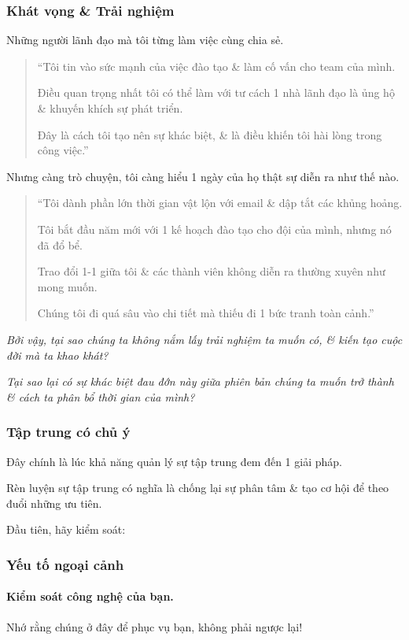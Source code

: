 \documentclass{article}
\begin{document}
\subsubsection{Khát vọng \& Trải nghiệm}
Những người lãnh đạo mà tôi từng làm việc cùng chia sẻ.
\begin{quotation}
	``Tôi tin vào sức mạnh của việc đào tạo \& làm cố vấn cho team của mình.
	
	Điều quan trọng nhất tôi có thể làm với tư cách 1 nhà lãnh đạo là ủng hộ \& khuyến khích sự phát triển.
	
	Đây là cách tôi tạo nên sự khác biệt, \& là điều khiến tôi hài lòng trong công việc.''
\end{quotation}
Nhưng càng trò chuyện, tôi càng hiểu 1 ngày của họ thật sự diễn ra như thế nào.
\begin{quotation}
	``Tôi dành phần lớn thời gian vật lộn với email \& dập tắt các khủng hoảng.
	
	Tôi bắt đầu năm mới với 1 kế hoạch đào tạo cho đội của mình, nhưng nó đã đổ bể.
	
	Trao đổi 1-1 giữa tôi \& các thành viên không diễn ra thường xuyên như mong muốn.
	
	Chúng tôi đi quá sâu vào chi tiết mà thiếu đi 1 bức tranh toàn cảnh.''
\end{quotation}
\textit{Bởi vậy, tại sao chúng ta không nắm lấy trải nghiệm ta muốn có, \& kiến tạo cuộc đời mà ta khao khát?}

\textit{Tại sao lại có sự khác biệt đau đớn này giữa phiên bản chúng ta muốn trở thành \& cách ta phân bổ thời gian của mình?}

\subsubsection{Tập trung có chủ ý}
Đây chính là lúc khả năng quản lý sự tập trung đem đến 1 giải pháp.

Rèn luyện sự tập trung có nghĩa là chống lại sự phân tâm \& tạo cơ hội để theo đuổi những ưu tiên.

Đầu tiên, hãy kiểm soát:

\subsubsection{Yếu tố ngoại cảnh}

\paragraph{Kiểm soát công nghệ của bạn.} Nhớ rằng chúng ở đây để phục vụ bạn, không phải ngược lại!
\end{document}

